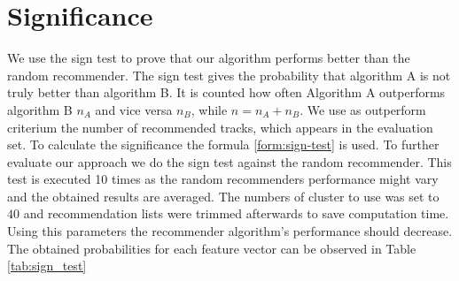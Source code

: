 \documentclass[cic,tc,english]{iiufrgs}
\begin{document}

\section{Significance}
We use the sign test to prove that our algorithm performs better than the random recommender. The sign test gives the probability that algorithm A is not truly better than algorithm B. It is counted how often Algorithm A outperforms algorithm B $n_A$ and vice versa $n_B$, while $n=n_A+n_B$. We use as outperform criterium the number of recommended tracks, which appears in the evaluation set. To calculate the significance the formula \ref{form:sign-test} is used. To further evaluate our approach we do the sign test against the random recommender. This test is executed 10 times as the random recommenders performance might vary and the obtained results are averaged. The numbers of cluster to use was set to $40$ and recommendation lists were trimmed afterwards to save computation time. Using this parameters the recommender algorithm's performance should decrease. The obtained probabilities for each feature vector can be observed in Table \ref{tab:sign_test}
\end{document}
